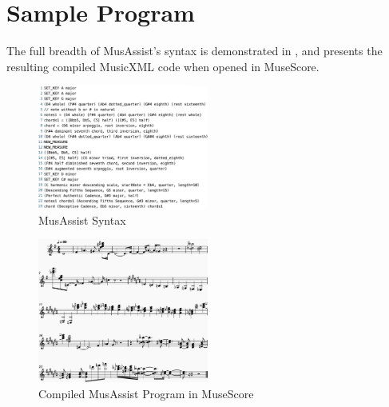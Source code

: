 \documentclass{article}
\begin{document}
\section{Sample Program}\label{sec:sample_program}
The full breadth of MusAssist's syntax is demonstrated in , and  presents the resulting compiled MusicXML code when opened in MuseScore. 

\begin{figure}[h!]
\centering
\includegraphics[width=0.5\textwidth]{images/example_program_code}
\vspace{-4mm}
\caption{MusAssist Syntax}\label{fig:example_program_code}
\end{figure}
\vspace{-6mm}
\begin{figure}[h!]
\centering
\includegraphics[width=0.5\textwidth]{images/example_program}
\caption{Compiled MusAssist Program in MuseScore}\label{fig:example_program}
\vspace{-3mm}
\end{figure}
  
\end{document}
